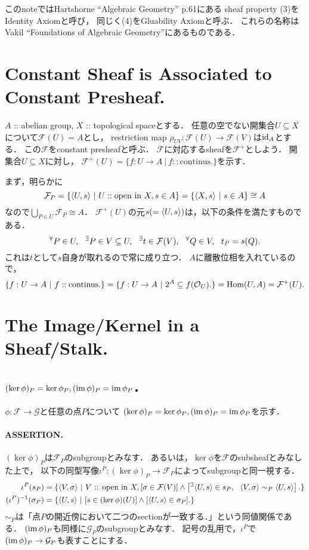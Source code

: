 \documentclass[a4paper]{jsarticle}
\newcommand{\shF}{\mathcal{F}}
\newcommand{\shG}{\mathcal{G}}
\newcommand{\OpenIn}{\text{ :: open in }}
\begin{document}
    このnoteではHartshorne ``Algebraic Geometry'' p.61にある
    sheaf property (3)をIdentity Axiomと呼び，
    同じく(4)をGluability Axiomと呼ぶ．
    これらの名称はVakil ``Foundations of Algebraic Geometry''にあるものである．

\section{Constant Sheaf is Associated to Constant Presheaf.} %
    $A$ :: abelian group, $X$ :: topological spaceとする．
    任意の空でない開集合$U \subseteq X$について$\shF(U)=A$とし，
    restriction map $\rho_{UV}: \shF(U) \to \shF(V)$は$\mathrm{id}_{A}$とする．
    この$\shF$をconstant presheafと呼ぶ．
    $\shF$に対応するsheafを$\shF^+$としよう．
    開集合$U \subseteq X$に対し，
    $\shF^+(U)=\{ f:U \to A ~|~ f :: \text{continus}. \}$を示す．

    まず，明らかに
    \[ \shF_P=\{ \reg{U}{s} ~|~ U :: \text{open in }X, s \in A\}=\{ \reg{X}{s} ~|~ s \in A\} \cong A \]
    なので$\bigcup_{P \in U} \shF_P \cong A$．
    $\shF^+(U)$の元$s(=\langle U,s \rangle)$は，以下の条件を満たすものである．
    \[ \Forall{P \in U} \Exists{P \in V \subseteq U} \Exists{t \in \shF(V)} \Forall{Q \in V}  t_P=s(Q). \]
    これは$t$として$s$自身が取れるので常に成り立つ．
    $A$に離散位相を入れているので，
    \[ \{ f:U \to A ~|~ f :: \text{continus}. \}=\{ f:U \to A ~|~ 2^A \subseteq f(\mathcal{O}_U). \}=\Hom(U,A)=\shF^+(U). \]

\section{The Image/Kernel in a Sheaf/Stalk.} %
    \subsection{$(\ker \phi)_P=\ker \phi_P, (\operatorname{im} \phi)_P=\operatorname{im} \phi_P$．}
    $\phi: \shF \to \shG$と任意の点$P$について
    $(\ker \phi)_P=\ker \phi_P, (\operatorname{im} \phi)_P=\operatorname{im} \phi_P$を示す．

    \paragraph{ASSERTION.}
    $(\ker \phi)_P$は$\shF_P$のsubgroupとみなす．
    あるいは，$\ker \phi$を$\shF$のsubsheafとみなした上で，
    以下の同型写像$\iota^P: (\ker \phi)_P \to \shF_P$によってsubgroupと同一視する．
    \begin{align*}
        \iota^P(s_P)
        &=\{ \germ{V}{\sigma} ~|~ V \OpenIn X,
                                  [\sigma \in \shF(V)] \land \left[ \Exists{\germ{U}{s} \in s_P} \germ{V}{\sigma} \sim_P \germ{U}{s} \right]. \} \\
        (\iota^P)^{-1}(\sigma_P)&=\{ \germ{U}{s} ~|~ [s \in (\ker \phi)(U)] \land [\germ{U}{s} \in \sigma_P]. \}
    \end{align*}
    $\sim_P$は「点$P$の開近傍において二つのsectionが一致する．」という同値関係である．
    $(\operatorname{im} \phi)_P$も同様に$\shG_P$のsubgroupとみなす．
    記号の乱用で，$\iota^P$で$(\im \phi)_P \to \shG_P$も表すことにする．
\end{document}
